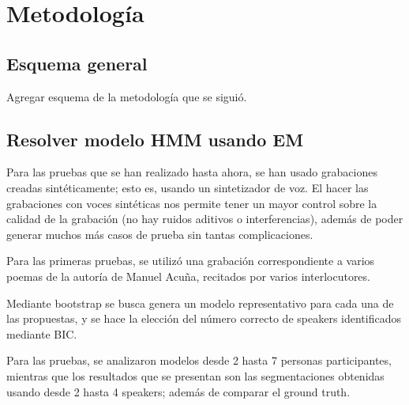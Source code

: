 
\chapter{Metodología}


\section{Esquema general} 

Agregar esquema de la metodología que se siguió.

\section{Resolver modelo HMM usando EM} 
\label{sec:sd-hmm-em}

Para las pruebas que se han realizado hasta ahora, se han usado grabaciones creadas sintéticamente; esto es, usando un sintetizador de voz. El hacer las grabaciones con voces sintéticas nos permite tener un mayor control sobre la calidad de la grabación (no hay ruidos aditivos o interferencias), además de poder generar muchos más casos de prueba sin tantas complicaciones.

Para las primeras pruebas, se utilizó una grabación correspondiente a varios poemas de la autoría de Manuel Acuña, recitados por varios interlocutores.

Mediante bootstrap se busca genera un modelo representativo para cada una de las propuestas, y  se hace la elección del número correcto de speakers identificados mediante BIC.

Para las pruebas, se analizaron modelos desde 2 hasta 7 personas participantes, mientras que los resultados que se presentan son las segmentaciones obtenidas usando desde 2 hasta 4 speakers; además de comparar el ground truth.


